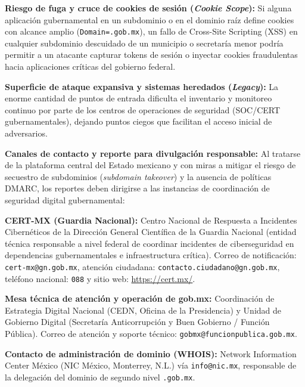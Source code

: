 \begin{itemizeColor}
\begin{itemizeColor}
\begin{enumerateColor}
            \item \textbf{Riesgo de fuga y cruce de cookies de sesión (\textit{Cookie Scope}):} Si alguna aplicación gubernamental en un subdominio o en el dominio raíz define cookies con alcance amplio (\texttt{Domain=.gob.mx}), un fallo de Cross-Site Scripting (XSS) en cualquier subdominio descuidado de un municipio o secretaría menor podría permitir a un atacante capturar tokens de sesión o inyectar cookies fraudulentas hacia aplicaciones críticas del gobierno federal.
            \item \textbf{Superficie de ataque expansiva y sistemas heredados (\textit{Legacy}):} La enorme cantidad de puntos de entrada dificulta el inventario y monitoreo continuo por parte de los centros de operaciones de seguridad (SOC/CERT gubernamentales), dejando puntos ciegos que facilitan el acceso inicial de adversarios.
        \end{enumerateColor}
    \end{itemizeColor}

    \item \textbf{Canales de contacto y reporte para divulgación responsable:}
    Al tratarse de la plataforma central del Estado mexicano y con miras a mitigar el riesgo de secuestro de subdominios (\textit{subdomain takeover}) y la ausencia de políticas DMARC, los reportes deben dirigirse a las instancias de coordinación de seguridad digital gubernamental:
    \begin{itemizeColor}
        \item \textbf{CERT-MX (Guardia Nacional):} Centro Nacional de Respuesta a Incidentes Cibernéticos de la Dirección General Científica de la Guardia Nacional (entidad técnica responsable a nivel federal de coordinar incidentes de ciberseguridad en dependencias gubernamentales e infraestructura crítica). Correo de notificación: \texttt{cert-mx@gn.gob.mx}, atención ciudadana: \texttt{contacto.ciudadano@gn.gob.mx}, teléfono nacional: \texttt{088} y sitio web: \url{https://cert.mx/}.
        \item \textbf{Mesa técnica de atención y operación de gob.mx:} Coordinación de Estrategia Digital Nacional (CEDN, Oficina de la Presidencia) y Unidad de Gobierno Digital (Secretaría Anticorrupción y Buen Gobierno / Función Pública). Correo de atención y soporte técnico: \texttt{gobmx@funcionpublica.gob.mx}.
        \item \textbf{Contacto de administración de dominio (WHOIS):} Network Information Center México (NIC México, Monterrey, N.L.) vía \texttt{info@nic.mx}, responsable de la delegación del dominio de segundo nivel \texttt{.gob.mx}.
    \end{itemizeColor}
\end{itemizeColor}

